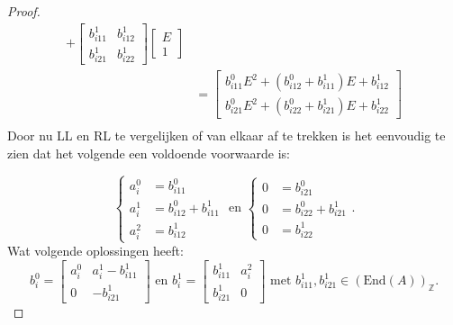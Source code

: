 \documentclass[a4paper,12pt]{article}
\begin{document}
\begin{proof}
\begin{align*}
        +
        \left[ {
                    \begin{array}{cc}
                        b^1_{i11} & b^1_{i12} \\
                        b^1_{i21} & b^1_{i22}
                    \end{array} } \right]
        \left[ {
        \begin{array}{c}
                        E \\
                        1
                    \end{array} } \right]                              \\
         & =
        \left[ {
        \begin{array}{c}
                        b^0_{i11} E^2 + (b^0_{i12}+b^1_{i11}) E +b^1_{i12} \\
                        b^0_{i21} E^2 + (b^0_{i22}+b^1_{i21}) E +b^1_{i22}
                    \end{array} } \right] \\
    \end{align*}
    Door nu LL en RL te vergelijken of van elkaar af te trekken
    is het eenvoudig te zien dat het volgende een voldoende voorwaarde is:

    $$\left\{
        \begin{aligned}
            a_i^0 & =  b^0_{i11}           \\
            a_i^1 & =  b^0_{i12}+b^1_{i11} \\
            a_i^2 & =  b^1_{i12}
        \end{aligned}
        \right. \text{ en }
        \left\{
        \begin{aligned}
            0 & =  b^0_{i21}           \\
            0 & =  b^0_{i22}+b^1_{i21} \\
            0 & =  b^1_{i22}
        \end{aligned}
        \right. .
    $$
    Wat volgende oplossingen  heeft:
    $$
        b_i^0 = \left[ {
                    \begin{array}{cc}
                        a_i^0 & a_i^1 - b_{i11}^1 \\
                        0     & -b_{i21}^1
                    \end{array} } \right] \text{ en }
        b_i^1 = \left[ {
                    \begin{array}{cc}
                        b_{i11}^1 & a_i^2 \\
                        b_{i21}^1 & 0
                    \end{array} } \right] \text{ met } b_{i11}^1,b_{i21}^1 \in (\text{End}(A))_\mathbb{Z} .
    $$
\end{proof}
\end{document}
